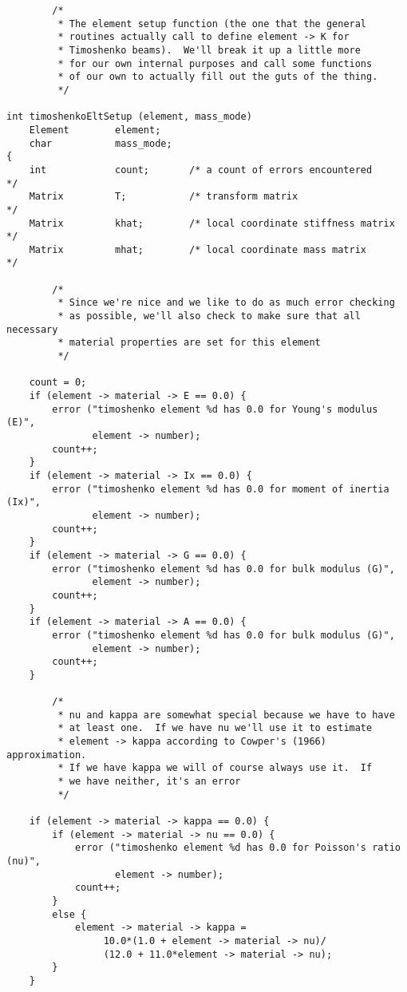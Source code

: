 {\small
\begin{screen}
 \begin{verbatim} 
        /*
         * The element setup function (the one that the general
         * routines actually call to define element -> K for
         * Timoshenko beams).  We'll break it up a little more
         * for our own internal purposes and call some functions
         * of our own to actually fill out the guts of the thing.
         */

int timoshenkoEltSetup (element, mass_mode)
    Element        element;
    char           mass_mode;
{
    int            count;       /* a count of errors encountered           */
    Matrix         T;           /* transform matrix                        */
    Matrix         khat;        /* local coordinate stiffness matrix       */
    Matrix         mhat;        /* local coordinate mass matrix            */
    
        /*
         * Since we're nice and we like to do as much error checking
         * as possible, we'll also check to make sure that all necessary
         * material properties are set for this element
         */

    count = 0;
    if (element -> material -> E == 0.0) {
        error ("timoshenko element %d has 0.0 for Young's modulus (E)",
               element -> number);
        count++;
    }
    if (element -> material -> Ix == 0.0) {
        error ("timoshenko element %d has 0.0 for moment of inertia (Ix)",
               element -> number);
        count++;
    }
    if (element -> material -> G == 0.0) {
        error ("timoshenko element %d has 0.0 for bulk modulus (G)",
               element -> number);
        count++;
    }
    if (element -> material -> A == 0.0) {
        error ("timoshenko element %d has 0.0 for bulk modulus (G)",
               element -> number);
        count++;
    }
   
        /*
         * nu and kappa are somewhat special because we have to have
         * at least one.  If we have nu we'll use it to estimate
         * element -> kappa according to Cowper's (1966) approximation.
         * If we have kappa we will of course always use it.  If
         * we have neither, it's an error
         */

    if (element -> material -> kappa == 0.0) {
        if (element -> material -> nu == 0.0) {
            error ("timoshenko element %d has 0.0 for Poisson's ratio (nu)",
                   element -> number);
            count++;
        }
        else {
            element -> material -> kappa = 
                 10.0*(1.0 + element -> material -> nu)/
                 (12.0 + 11.0*element -> material -> nu);
        }
    }


\end{verbatim}
\end{screen}}
